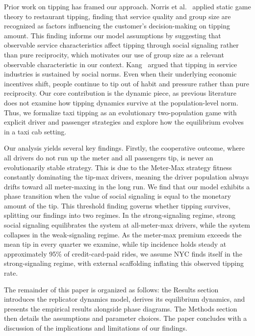 \documentclass[pdflatex,sn-mathphys-num]{sn-jnl}%
\theoremstyle{thmstyleone}%
\theoremstyle{thmstyletwo}%
\theoremstyle{thmstylethree}%
\begin{document}
Prior work on tipping has framed our approach. Norris et al.~\cite{norris2023} applied static game theory to restaurant tipping, finding that service quality and group size are recognized as factors influencing the customer's decision-making on tipping amount. This finding informs our model assumptions by suggesting that observable service characteristics affect tipping through social signaling rather than pure reciprocity, which motivates our use of group size as a relevant observable characteristic in our context. Kang~\cite{kang2021} argued that tipping in service industries is sustained by social norms. Even when their underlying economic incentives shift, people continue to tip out of habit and pressure rather than pure reciprocity. Our core contribution is the dynamic piece, as previous literature does not examine how tipping dynamics survive at the population-level norm. Thus, we formalize taxi tipping as an evolutionary two-population game with explicit driver and passenger strategies and explore how the equilibrium evolves in a taxi cab setting.

Our analysis yields several key findings. Firstly, the cooperative outcome, where all drivers do not run up the meter and all passengers tip, is never an evolutionarily stable strategy. This is due to the Meter-Max strategy fitness constantly dominating the tip-max drivers, meaning the driver population always drifts toward all meter-maxing in the long run. We find that our model exhibits a phase transition when the value of social signaling is equal to the monetary amount of the tip. This threshold finding governs whether tipping survives, splitting our findings into two regimes. In the strong-signaling regime, strong social signaling equilibrates the system at all-meter-max drivers, while the system collapses in the weak-signaling regime. As the meter-max premium exceeds the mean tip in every quarter we examine, while tip incidence holds steady at approximately 95\% of credit-card-paid rides, we assume NYC finds itself in the strong-signaling regime, with external scaffolding inflating this observed tipping rate.

The remainder of this paper is organized as follows: the Results section introduces the replicator dynamics model, derives its equilibrium dynamics, and presents the empirical results alongside phase diagrams. The Methods section then details the assumptions and parameter choices. The paper concludes with a discussion of the implications and limitations of our findings.

\end{document}
